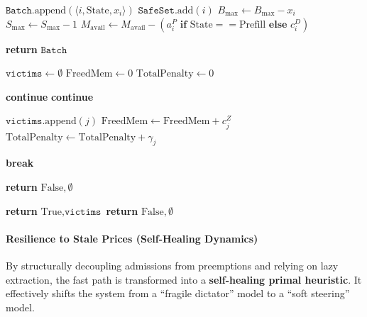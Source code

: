 \documentclass[11pt]{article}
\begin{document}
\begin{algorithm}[htpb]
\begin{algorithmic}[1]
        \State {}
            \State $\texttt{Batch}.\text{append}(\langle i, \text{State}, x_i \rangle)$
            \State $\texttt{SafeSet}.\text{add}(i)$ 
            \State $B_{\max} \gets B_{\max} - x_i$
            \State $S_{\max} \gets S_{\max} - 1$
            \State \(M_{\mathrm{avail}} \gets M_{\mathrm{avail}} - (a_i^P \textbf{ if } \text{State} == \text{Prefill} \textbf{ else } c_i^D)\)
        \EndIf
    \EndFor
    
    \State \textbf{return} $\texttt{Batch}$
\EndProcedure
\end{algorithmic}
\end{algorithm}

\begin{algorithm}[htpb]
\caption{Lazy Eviction Decision Check}
\label{alg:lazy_evict}
\begin{algorithmic}[1]
    \State $\texttt{victims} \gets \emptyset$
    \State $\text{FreedMem} \gets 0$
    \State $\text{TotalPenalty} \gets 0$
    
         \textbf{continue} \EndIf {}
         \textbf{continue} \EndIf
        
        \State $\texttt{victims}.\text{append}(j)$
        \State $\text{FreedMem} \gets \text{FreedMem} + c_j^Z$
        \State $\text{TotalPenalty} \gets \text{TotalPenalty} + \gamma_j$
        
         \textbf{break} \EndIf
    \EndFor
    
        \State \textbf{return} $\text{False}, \emptyset$ 
    \EndIf
    
        \State \textbf{return} $\text{True}, \texttt{victims}$ 
    \Else
        \State \textbf{return} $\text{False}, \emptyset$ 
    \EndIf
\EndProcedure
\end{algorithmic}
\end{algorithm}

\paragraph{Resilience to Stale Prices (Self-Healing Dynamics)}
By structurally decoupling admissions from preemptions and relying on lazy extraction, the fast path is transformed into a \textbf{self-healing primal heuristic}. It effectively shifts the system from a ``fragile dictator'' model to a ``soft steering'' model. 
\end{document}
